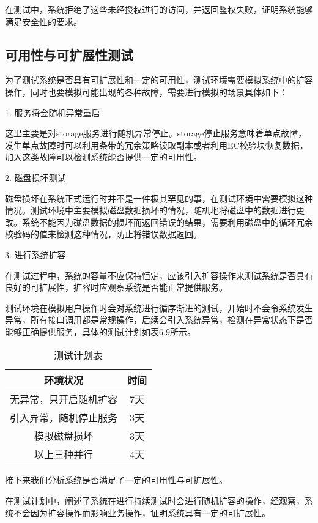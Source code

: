 在测试中，系统拒绝了这些未经授权进行的访问，并返回鉴权失败，证明系统能够满足安全性的要求。

\subsection{可用性与可扩展性测试}%

为了测试系统是否具有可扩展性和一定的可用性，测试环境需要模拟系统中的扩容操作，同时也要模拟可能出现的各种故障，需要进行模拟的场景具体如下：

1. 服务将会随机异常重启

这里主要是对storage服务进行随机异常停止。storage停止服务意味着单点故障，发生单点故障时可以利用条带的冗余策略读取副本或者利用EC校验块恢复数据，加入这类故障可以检测系统能否提供一定的可用性。

2. 磁盘损坏测试

磁盘损坏在系统正式运行时并不是一件极其罕见的事，在测试环境中需要模拟这种情况。测试环境中主要模拟磁盘数据损坏的情况，随机地将磁盘中的数据进行更改。系统不能因为磁盘数据的损坏而返回错误的结果，需要利用磁盘中的循环冗余校验码的值来检测这种情况，防止将错误数据返回。

3. 进行系统扩容

在测试过程中，系统的容量不应保持恒定，应该引入扩容操作来测试系统是否具有良好的可扩展性，扩容时应观察系统是否能正常提供服务。

测试环境在模拟用户操作时会对系统进行循序渐进的测试，开始时不会令系统发生异常，所有接口调用都是常规操作，后续会引入系统异常，检测在异常状态下是否能够正确提供服务，具体的测试计划如表6.9所示。

\begin{table}[h]
    \centering
    \caption{测试计划表}
    \begin{tabular}{cc}
      \toprule
      环境状况   & 时间   \\
      \midrule
      无异常，只开启随机扩容  & 7天  \\
      引入异常，随机停止服务  & 3天     \\
      模拟磁盘损坏           & 3天  \\
      以上三种并行           & 4天     \\
      \bottomrule
    \end{tabular}
\end{table}

接下来我们分析系统是否满足了一定的可用性与可扩展性。

在测试计划中，阐述了系统在进行持续测试时会进行随机扩容的操作，经观察，系统不会因为扩容操作而影响业务操作，证明系统具有一定的可扩展性。

